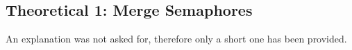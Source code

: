 \documentclass[11pt,a4paper]{article}
\theoremstyle{plain}
\theoremstyle{definition}
\theoremstyle{remark}
\numberwithin{equation}{section}
\begin{document}

\clearpage\maketitle
\thispagestyle{empty}
\clearpage\newpage
\thispagestyle{plain}



\subsection*{Theoretical 1: Merge Semaphores}

An explanation was not asked for, therefore only a short one has been provided.
\end{document}
